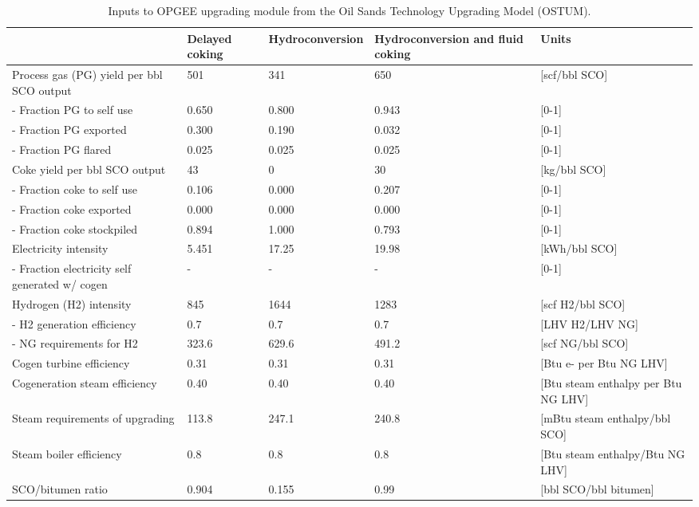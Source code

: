 \documentclass[11pt]{report}
\begin{document}
\begin{landscape}
\begin{table}
\caption{Inputs to OPGEE upgrading module from the Oil Sands Technology Upgrading Model (OSTUM).}
\label{tab:upgrading_data}
\begin{scriptsize}
\begin{tabularx}{1\columnwidth}{p{}p{}p{}p{}p{}}
\toprule
							&Delayed coking     & Hydroconversion & Hydroconversion and fluid coking &      Units \\ 
\midrule
Process gas (PG) yield per bbl SCO output       & 501   	& 341   & 650   		& [scf/bbl SCO]   \\
\quad - Fraction PG to self use  	& 0.650 	& 0.800& 0.943 		& {[}0-1{]}     \\
\quad - Fraction PG exported     	& 0.300 	& 0.190& 0.032 		& {[}0-1{]}     \\
\quad - Fraction PG flared       	& 0.025 	& 0.025  & 0.025 		& {[}0-1{]}     \\
Coke yield per bbl SCO output        		& 43   	& 0       & 30  			& [kg/bbl SCO]    \\
\quad - Fraction coke to self use	& 0.106 	& 0.000& 0.207 		& {[}0-1{]}     \\
\quad - Fraction coke exported   	& 0.000 	& 0.000& 0.000 		& {[}0-1{]}     \\
\quad - Fraction coke stockpiled 	& 0.894 	& 1.000& 0.793 		& {[}0-1{]}     \\
Electricity intensity      			& 5.451 	& 17.25& 19.98 		& [kWh/bbl SCO]   \\
\quad - Fraction electricity self generated w/ cogen 	& -     	& -        & -     		& {[}0-1{]}     \\
Hydrogen (H2) intensity    		& 845   	& 1644 & 1283   		& [scf H2/bbl SCO]\\
\quad- H2 generation efficiency 	& 0.7   	& 0.7    & 0.7   		& [LHV H2/LHV NG]     \\
\quad- NG requirements for H2   	& 323.6 	& 629.6& 491.2 		& [scf NG/bbl SCO]         \\
Cogen turbine efficiency   		& 0.31  	& 0.31  & 0.31  		& [Btu e- per Btu NG LHV]   \\
Cogeneration steam efficiency       		& 0.40  	& 0.40  & 0.40  		& [Btu steam enthalpy per Btu NG LHV] \\
Steam requirements of upgrading      	& 113.8 	& 247.1& 240.8 		& [mBtu steam enthalpy/bbl SCO]       \\
Steam boiler efficiency    		& 0.8   	& 0.8    & 0.8   		& [Btu steam enthalpy/Btu NG LHV]     \\
SCO/bitumen ratio		& 0.904         	& 0.155  & 0.99 		& [bbl SCO/bbl bitumen]     \\ 
\bottomrule
\end{tabularx}
\end{scriptsize}
\end{table}
\end{landscape}
\end{document}

